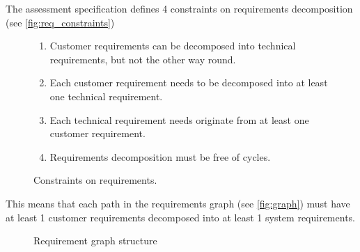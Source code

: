 \documentclass[11pt,a4paper]{article}
\begin{document}
	The assessment specification defines 4 constraints on requirements decomposition (see \autoref{fig:req_constraints})

	\begin{figure}[h!]
	\begin{framed}

		\begin{enumerate}[noitemsep] \label{lst:constraints}
			\item Customer requirements can be decomposed into technical requirements, but not the other way round.
			\item Each customer requirement needs to be decomposed into at least one technical requirement.
			\item Each technical requirement needs originate from at least one customer requirement.
			\item Requirements decomposition must be free of cycles.
		\end{enumerate}

	\caption{Constraints on requirements.}
	\label{fig:req_constraints}
	\end{framed}
	\end{figure}

	This means that each path in the requirements graph (see \autoref{fig:graph}) must have at least 1 customer requirements decomposed into at least 1 system requirements.
	
	\begin{figure}[h!]
		
		\centering
	
		
		\caption{Requirement graph structure}
		\label{fig:graph}
	\end{figure}	
\end{document}

